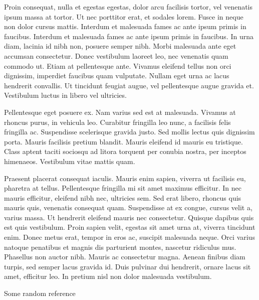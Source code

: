 Proin consequat, nulla et egestas egestas, dolor arcu facilisis tortor, vel venenatis ipsum massa at tortor. Ut nec porttitor erat, et sodales lorem. Fusce in neque non dolor cursus mattis. Interdum et malesuada fames ac ante ipsum primis in faucibus. Interdum et malesuada fames ac ante ipsum primis in faucibus. In urna diam, lacinia id nibh non, posuere semper nibh. Morbi malesuada ante eget accumsan consectetur. Donec vestibulum laoreet leo, nec venenatis quam commodo ut. Etiam at pellentesque ante. Vivamus eleifend tellus non orci dignissim, imperdiet faucibus quam vulputate. Nullam eget urna ac lacus hendrerit convallis. Ut tincidunt feugiat augue, vel pellentesque augue gravida et. Vestibulum luctus in libero vel ultricies.

Pellentesque eget posuere ex. Nam varius sed est at malesuada. Vivamus at rhoncus purus, in vehicula leo. Curabitur fringilla leo nunc, a facilisis felis fringilla ac. Suspendisse scelerisque gravida justo. Sed mollis lectus quis dignissim porta. Mauris facilisis pretium blandit. Mauris eleifend id mauris eu tristique. Class aptent taciti sociosqu ad litora torquent per conubia nostra, per inceptos himenaeos. Vestibulum vitae mattis quam.

Praesent placerat consequat iaculis. Mauris enim sapien, viverra ut facilisis eu, pharetra at tellus. Pellentesque fringilla mi sit amet maximus efficitur. In nec mauris efficitur, eleifend nibh nec, ultricies sem. Sed erat libero, rhoncus quis mauris quis, venenatis consequat quam. Suspendisse at ex congue, cursus velit a, varius massa. Ut hendrerit eleifend mauris nec consectetur. Quisque dapibus quis est quis vestibulum. Proin sapien velit, egestas sit amet urna at, viverra tincidunt enim. Donec metus erat, tempor in eros ac, suscipit malesuada neque. Orci varius natoque penatibus et magnis dis parturient montes, nascetur ridiculus mus. Phasellus non auctor nibh. Mauris ac consectetur magna. Aenean finibus diam turpis, sed semper lacus gravida id. Duis pulvinar dui hendrerit, ornare lacus sit amet, efficitur leo. In pretium nisl non dolor malesuada vestibulum.

Some random reference \cite{albertyUseLegendreTransforms2001}
